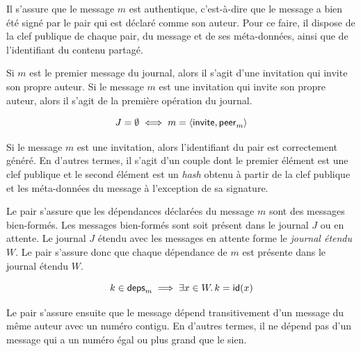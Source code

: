 
Il s'assure que le message $m$ est authentique, c'est-à-dire que le message a bien été signé par le pair qui est déclaré comme son auteur.
Pour ce faire, il dispose de la clef publique de chaque pair, du message et de ses méta-données, ainsi que de l'identifiant du contenu partagé.



Si $m$ est le premier message du journal, alors il s'agit d'une invitation qui invite son propre auteur.
Si le message $m$ est une invitation qui invite son propre auteur, alors il s'agit de la première opération du journal.

\begin{equation*}
    J = \emptyset \iff m = \tuple*{\trm{invite}, \trm{peer}_m}
\end{equation*}

Si le message $m$ est une invitation, alors l'identifiant du pair est correctement généré.
En d'autres termes, il s'agit d'un couple dont le premier élément est une clef publique et le second élément est un \emph{hash} obtenu à partir de la clef publique et les méta-données du message à l'exception de sa signature.

Le pair s'assure que les dépendances déclarées du message $m$ sont des messages bien-formés.
Les messages bien-formés sont soit présent dans le journal $J$ ou en attente.
Le journal $J$ étendu avec les messages en attente forme le \emph{journal étendu} $W$.
Le pair s'assure donc que chaque dépendance de $m$ est présente dans le journal étendu $W$.

\begin{equation*}
    k \in \trm{deps}_m \implies \exists x \in W \qsep k = \trm{id}(x)
\end{equation*}

Le pair s'assure ensuite que le message dépend transitivement d'un message du même auteur avec un numéro contigu.
En d'autres termes, il ne dépend pas d'un message qui a un numéro égal ou plus grand que le sien.

